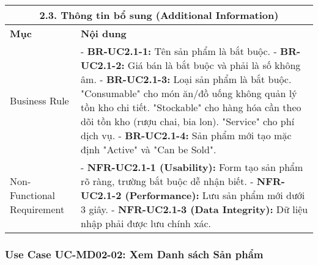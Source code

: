 \begin{longtable}{|m{4cm}|p{11cm}|}
\hline
\multicolumn{2}{|c|}{\textbf{2.3. Thông tin bổ sung (Additional Information)}} \\
\hline
\textbf{Mục} & \textbf{Nội dung} \\
\hline
Business Rule & - \textbf{BR-UC2.1-1:} Tên sản phẩm là bắt buộc. \newline - \textbf{BR-UC2.1-2:} Giá bán là bắt buộc và phải là số không âm. \newline - \textbf{BR-UC2.1-3:} Loại sản phẩm là bắt buộc. "Consumable" cho món ăn/đồ uống không quản lý tồn kho chi tiết. "Stockable" cho hàng hóa cần theo dõi tồn kho (rượu chai, bia lon). "Service" cho phí dịch vụ. \newline - \textbf{BR-UC2.1-4:} Sản phẩm mới tạo mặc định "Active" và "Can be Sold". \\
\hline
Non-Functional Requirement & - \textbf{NFR-UC2.1-1 (Usability):} Form tạo sản phẩm rõ ràng, trường bắt buộc dễ nhận biết. \newline - \textbf{NFR-UC2.1-2 (Performance):} Lưu sản phẩm mới dưới 3 giây. \newline - \textbf{NFR-UC2.1-3 (Data Integrity):} Dữ liệu nhập phải được lưu chính xác. \\
\hline
\end{longtable}

\subsubsection{Use Case UC-MD02-02: Xem Danh sách Sản phẩm}


